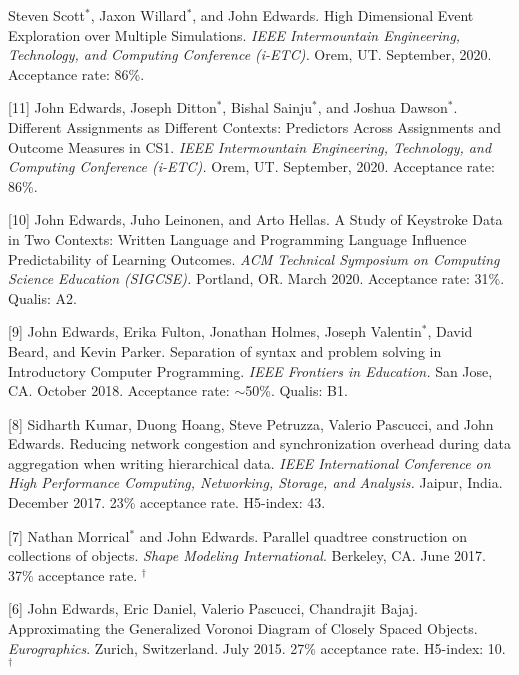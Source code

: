 \documentclass[margin,line]{res}
\newcommand{\pubunder}[1]{#1}
\newcommand{\cnum}[1]{[#1]}
\begin{document}
\begin{resume}
\cnum{12} Steven Scott$^*$, Jaxon Willard$^*$, and \pubunder{John Edwards}. High Dimensional Event Exploration over Multiple Simulations. \textit{IEEE Intermountain Engineering, Technology, and Computing Conference (i-ETC).} Orem, UT. September, 2020. Acceptance rate: 86\%.

\cnum{11} John Edwards, Joseph Ditton$^*$, Bishal Sainju$^*$, and Joshua Dawson$^*$. Different Assignments as Different Contexts: Predictors Across Assignments and Outcome Measures in CS1. \textit{IEEE Intermountain Engineering, Technology, and Computing Conference (i-ETC).} Orem, UT. September, 2020. Acceptance rate: 86\%.

\cnum{10} John Edwards, Juho Leinonen, and Arto Hellas. A Study of Keystroke Data in Two Contexts: Written Language and Programming Language Influence Predictability of Learning Outcomes.  \textit{ACM Technical Symposium on Computing Science Education (SIGCSE).} Portland, OR. March 2020.  Acceptance rate: 31\%. Qualis: A2.

\cnum{9} John Edwards, Erika Fulton, Jonathan Holmes, Joseph Valentin$^*$, David Beard, and Kevin Parker. Separation of syntax and problem solving in Introductory Computer Programming. \textit{IEEE Frontiers in Education.} San Jose, CA. October 2018.  Acceptance rate: $\sim$50\%. Qualis: B1.

\cnum{8} Sidharth Kumar, Duong Hoang, Steve Petruzza, Valerio Pascucci, and \pubunder{John Edwards}. Reducing network congestion and synchronization overhead during data aggregation when writing hierarchical data. \textit{IEEE International Conference on High Performance Computing, Networking, Storage, and Analysis.} Jaipur, India. December 2017. 23\% acceptance rate. H5-index: 43.

\cnum{7} Nathan Morrical$^*$ and \pubunder{John Edwards}. Parallel quadtree construction on collections of objects. \textit{Shape Modeling International}. Berkeley, CA. June 2017. 37\% acceptance rate.
$^\dagger$

\cnum{6} \pubunder{John Edwards}, Eric Daniel, Valerio Pascucci, Chandrajit Bajaj. Approximating the Generalized Voronoi Diagram of Closely Spaced Objects. \textit{Eurographics}. Zurich, Switzerland. July 2015. 27\% acceptance rate. H5-index: 10.
$^\dagger$


\end{resume}
\end{document}
